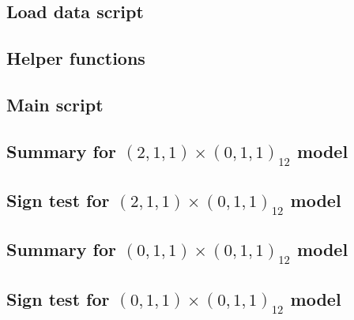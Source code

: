 \subsection{Load data script}


\subsection{Helper functions}


\subsection{Main script}


\subsection{Summary for $(2,1,1)\times(0,1,1)_{12}$ model}\label{app:summary-m1}


\subsection{Sign test for $(2,1,1)\times(0,1,1)_{12}$ model}


\subsection{Summary for $(0,1,1)\times(0,1,1)_{12}$ model}\label{app:summary-m2}


\subsection{Sign test for $(0,1,1)\times(0,1,1)_{12}$ model}


\pagebreak




